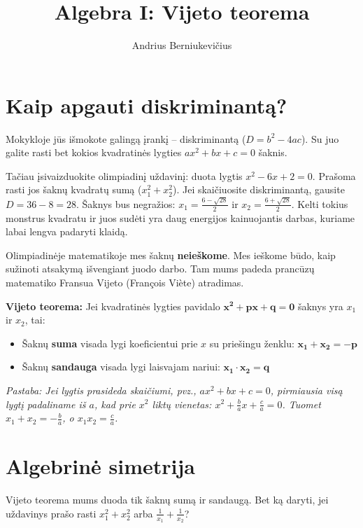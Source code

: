 \documentclass[11pt,a4paper]{scrartcl}
\title{Algebra I: Vijeto teorema}
\author{Andrius Berniukevičius}
\begin{document}
\maketitle

\section{Kaip apgauti diskriminantą?}

Mokykloje jūs išmokote galingą įrankį – diskriminantą ($D = b^2 - 4ac$). Su juo galite rasti bet kokios kvadratinės lygties $ax^2 + bx + c = 0$ šaknis. 

Tačiau įsivaizduokite olimpiadinį uždavinį: duota lygtis $x^2 - 6x + 2 = 0$. Prašoma rasti jos šaknų kvadratų sumą ($x_1^2 + x_2^2$). 
Jei skaičiuosite diskriminantą, gausite $D = 36 - 8 = 28$. Šaknys bus negražios: $x_1 = \frac{6 - \sqrt{28}}{2}$ ir $x_2 = \frac{6 + \sqrt{28}}{2}$. Kelti tokius monstrus kvadratu ir juos sudėti yra daug energijos kainuojantis darbas, kuriame labai lengva padaryti klaidą.

Olimpiadinėje matematikoje mes šaknų \textbf{neieškome}. Mes ieškome būdo, kaip sužinoti atsakymą išvengiant juodo darbo. Tam mums padeda prancūzų matematiko Fransua Vijeto (François Viète) atradimas.

\textbf{Vijeto teorema:}
Jei kvadratinės lygties pavidalo $\mathbf{x^2 + px + q = 0}$ šaknys yra $x_1$ ir $x_2$, tai:
\begin{itemize}
    \item Šaknų \textbf{suma} visada lygi koeficientui prie $x$ su priešingu ženklu: $\mathbf{x_1 + x_2 = -p}$
    \item Šaknų \textbf{sandauga} visada lygi laisvajam nariui: $\mathbf{x_1 \cdot x_2 = q}$
\end{itemize}
\textit{Pastaba: Jei lygtis prasideda skaičiumi, pvz., $ax^2 + bx + c = 0$, pirmiausia visą lygtį padaliname iš $a$, kad prie $x^2$ liktų vienetas: $x^2 + \frac{b}{a}x + \frac{c}{a} = 0$. Tuomet $x_1 + x_2 = -\frac{b}{a}$, o $x_1 x_2 = \frac{c}{a}$.}

\section{Algebrinė simetrija}

Vijeto teorema mums duoda tik šaknų sumą ir sandaugą. Bet ką daryti, jei uždavinys prašo rasti $x_1^2 + x_2^2$ arba $\frac{1}{x_1} + \frac{1}{x_2}$?
\end{document}
